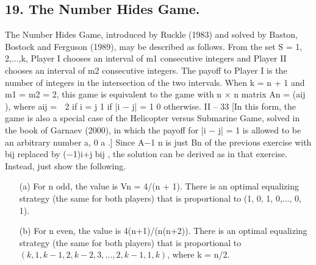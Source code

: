 \subsection{19. The Number Hides Game.} 
The Number Hides Game, introduced by Ruckle
(1983) and solved by Baston, Bostock and Ferguson (1989), may be described as follows.
From the set S = {1, 2,...,k}, Player I chooses an interval of m1 consecutive integers
and Player II chooses an interval of m2 consecutive integers. The payoff to Player I is
the number of integers in the intersection of the two intervals. When k = n + 1 and
m1 = m2 = 2, this game is equivalent to the game with n × n matrix An = (aij ), where
aij =
 2 if i = j
1 if |i − j| = 1
0 otherwise.
II – 33
[In this form, the game is also a special case of the Helicopter versus Submarine
Game, solved in the book of Garnaev (2000), in which the payoff for |i − j| = 1 is allowed
to be an arbitrary number a, 0 \leq a .] Since A−1 n is just Bn of the previous exercise
with bij replaced by (−1)i+j bij , the solution can be derived as in that exercise. Instead,
just show the following.
\begin{itemize}
\item[(a)] For n odd, the value is Vn = 4/(n + 1). There is an optimal equalizing strategy
(the same for both players) that is proportional to (1, 0, 1, 0,..., 0, 1).
\item[(b)] For n even, the value is 4(n+1)/(n(n+2)). There is an optimal equalizing strategy
(the same for both players) that is proportional to $(k, 1, k − 1, 2, k − 2, 3,..., 2, k − 1, 1, k)$,
where k = n/2.
\end{itemize}

